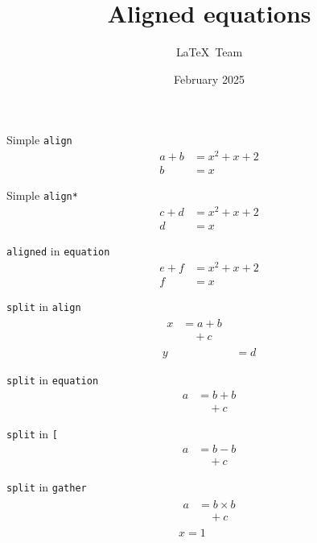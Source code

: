\documentclass[a4paper]{article}
\title{Aligned equations}
\author{\LaTeX\ Team}
\date{February 2025}
\begin{document}
\maketitle



Simple \texttt{align}
\begin{align}
  a+b&=x^2+x+2\\
    b&=x
\end{align}



Simple \texttt{align*}
\begin{align*}
  c+d&=x^2+x+2\\
    d&=x
\end{align*}


\texttt{aligned} in \texttt{equation}
\begin{equation}
\begin{aligned}
  e+f&=x^2+x+2\\
    f&=x
\end{aligned}
\end{equation}

\texttt{split} in \texttt{align}
\begin{align}
\begin{split}
  x&= a  +  b\\
   &\quad + c
\end{split}\\
  y&=d
\end{align}

\texttt{split} in \texttt{equation}
\begin{equation}
\begin{split}
 a & = b+b\\
   &\quad + c
\end{split} 
\end{equation}

\texttt{split} in \texttt{[}
\[
\begin{split}
 a & = b-b\\
   &\quad + c
\end{split} 
  \]

\texttt{split} in \texttt{gather} 
\begin{gather}
\begin{split}
 a & = b\times b\\
   &\quad + c
\end{split}\\
x=1
\end{gather}
\end{document}
